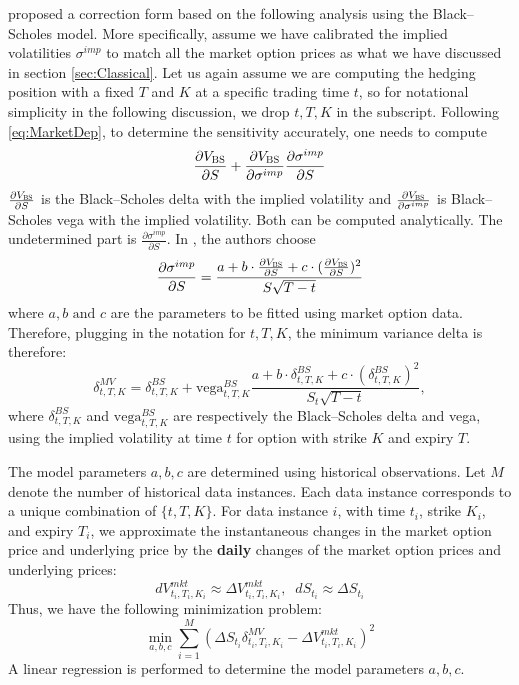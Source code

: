 \documentclass[letterpaper,12pt,titlepage,oneside,final]{book}
\numberwithin{equation}{section}
\theoremstyle{definition}
\newcommand{\BS}{\textsc{BS}}
\newcommand{\Vmkt}{V^{mkt}}
\newcommand{\Smkt}{S}
\newcommand{\MV}{\bf \textsc{MV}}
\begin{document}
\citet{hulloptimal} proposed a correction form  based on the following analysis using the Black–Scholes model. 
More specifically, assume we have calibrated the implied volatilities $\sigma^{imp}$ to match all the market option prices as what we have discussed in section \ref{sec:Classical}.
Let us again assume we  are computing  the hedging position  with a fixed $T$ and $K$ at a specific trading time $t$, so for notational simplicity in the following discussion, we drop ${t,T,K}$ in the subscript. Following \eqref{eq:MarketDep}, to determine the  sensitivity accurately, one needs to compute 
\begin{equation} \label{eq:Chain}
\frac{\partial V_\BS}{\partial S} + \frac{\partial V_\BS}{\partial \sigma^{imp}}
\frac{\partial \sigma^{imp}}{\partial S}
\end{equation}
$
\frac{\partial V_\BS}{\partial S}
$ is the Black–Scholes delta with the implied volatility and $\frac{\partial V_\BS}{\partial \sigma^{imp}}$ is Black–Scholes vega with the implied volatility. Both can be computed analytically. The undetermined part is $\frac{\partial \sigma^{imp}}{\partial S}$.
In \cite{hulloptimal}, the authors choose  
$$
\frac{\partial \sigma^{imp}}{\partial S} =
\frac{a+b \cdot\frac{\partial V_\BS}{\partial S}+c \cdot (\frac{\partial V_\BS}{\partial S})^2}{S \sqrt{T-t}}
$$
where $a, b \text{ and  } c$ are the parameters to be fitted using  market option data. Therefore, plugging in the notation for $t,T,K$,
the minimum variance delta is therefore:
\begin{equation}
\delta^{MV}_{t,T,K}=\delta^{BS}_{t,T,K}+\text{vega}^{BS}_{t,T,K} \frac{a+b \cdot \delta^{BS}_{t,T,K} +c \cdot (\delta^{BS}_{t,T,K})^2}{S_t\sqrt{T-t}},
\label{eq:HullWhite}
\end{equation}
where $\delta^{BS}_{t,T,K}$ and $\text{vega}^{BS}_{t,T,K}$ are respectively the Black–Scholes delta and vega, using the implied volatility at time $t$ for option with strike $K$ and expiry $T$.

The model parameters $a,b,c$ are determined using historical observations.
Let $M$ denote the number of historical data instances. Each data instance corresponds to a unique combination of $\{t,T,K\}$. For data instance $i$, with time $t_i$, strike $K_i$, and expiry $T_i$, we approximate the instantaneous changes in the market option price and underlying price by the \textbf{daily} changes of the market option prices and underlying prices:
\[
    d\Vmkt_{t_i,T_i,K_i} \approx \Delta \Vmkt_{t_i,T_i,K_i},\;\;
    d\Smkt_{t_i} \approx \Delta S_{t_i}
\]
Thus, we have the following minimization problem:
\[
\min_{a,b,c} \sum_{i=1}^M \left(\Delta S_{t_i} \delta^{MV}_{t_i,T_i,K_i} -\Delta \Vmkt_{t_i,T_i,K_i}   \right)^2
\]
A linear regression is performed to determine the model parameters $a,b,c$.
\end{document}
